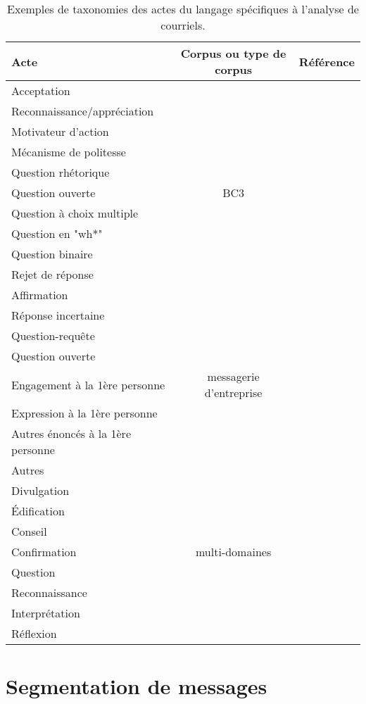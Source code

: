 \begin{table}
	\begin{tabularx}{\textwidth}{Y c c}
		\toprule
		Acte & Corpus ou type de corpus & Référence \\
		\midrule
		Acceptation &  & \\
		Reconnaissance/appréciation &  & \\
		Motivateur d'action &  & \\
		Mécanisme de politesse &  & \\
		Question rhétorique &  & \\
		Question ouverte & BC3 & \cite{JanAAAI08} \\
		Question à choix multiple &  & \\
		Question en "wh*" &  & \\
		Question binaire &  & \\
		Rejet de réponse &  & \\
		Affirmation &  & \\
		Réponse incertaine &  & \\
		\midrule					
		Question-requête &  & \\
		Question ouverte &  & \\
		Engagement à la 1ère personne & messagerie d'entreprise & \cite{de2013classification} \\
		Expression à la 1ère personne &  & \\
		Autres énoncés à la 1ère personne &  & \\
		Autres &  & \\
		\midrule
		Divulgation &  & \\
		Édification &  & \\
		Conseil &  & \\
		Confirmation & multi-domaines & \cite{Lampert_classifyingspeech} \\
		Question &  & \\
		Reconnaissance &  & \\
		Interprétation &  & \\
		Réflexion &  & \\
		\bottomrule
	\end{tabularx}
	\caption{Exemples de taxonomies des actes du langage spécifiques à l'analyse de courriels.}
	\label{fig:emailTaxonomies}
\end{table}

\section{Segmentation de messages}

